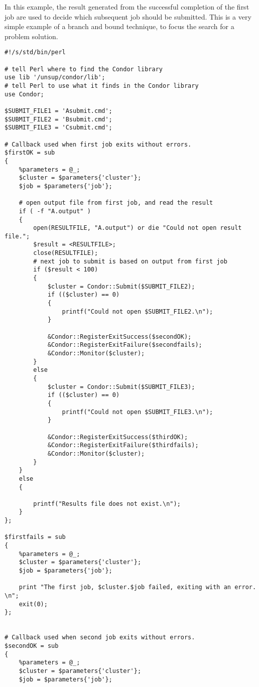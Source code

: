 In this example, the result generated from the successful completion of
the first job are used to decide which subsequent job should be
submitted.
This is a very simple example of a branch and bound technique,
to focus the search for a problem solution.

\begin{verbatim}
#!/s/std/bin/perl

# tell Perl where to find the Condor library
use lib '/unsup/condor/lib';
# tell Perl to use what it finds in the Condor library
use Condor;

$SUBMIT_FILE1 = 'Asubmit.cmd';
$SUBMIT_FILE2 = 'Bsubmit.cmd';
$SUBMIT_FILE3 = 'Csubmit.cmd';

# Callback used when first job exits without errors.
$firstOK = sub
{
    %parameters = @_;
    $cluster = $parameters{'cluster'};
    $job = $parameters{'job'};

    # open output file from first job, and read the result
    if ( -f "A.output" )
    {
        open(RESULTFILE, "A.output") or die "Could not open result file.";
        $result = <RESULTFILE>;
        close(RESULTFILE);
        # next job to submit is based on output from first job
        if ($result < 100)
        {
            $cluster = Condor::Submit($SUBMIT_FILE2);
            if (($cluster) == 0)
            {
                printf("Could not open $SUBMIT_FILE2.\n");
            }

            &Condor::RegisterExitSuccess($secondOK);
            &Condor::RegisterExitFailure($secondfails);
            &Condor::Monitor($cluster);
        }
        else
        {
            $cluster = Condor::Submit($SUBMIT_FILE3);
            if (($cluster) == 0)
            {
                printf("Could not open $SUBMIT_FILE3.\n");
            }

            &Condor::RegisterExitSuccess($thirdOK);
            &Condor::RegisterExitFailure($thirdfails);
            &Condor::Monitor($cluster);
        }
    }
    else
    {
        
        printf("Results file does not exist.\n");
    }
};	

$firstfails = sub
{
    %parameters = @_;
    $cluster = $parameters{'cluster'};
    $job = $parameters{'job'};

    print "The first job, $cluster.$job failed, exiting with an error. \n";
    exit(0);
};	


# Callback used when second job exits without errors.
$secondOK = sub
{
    %parameters = @_;
    $cluster = $parameters{'cluster'};
    $job = $parameters{'job'};


\end{verbatim}
